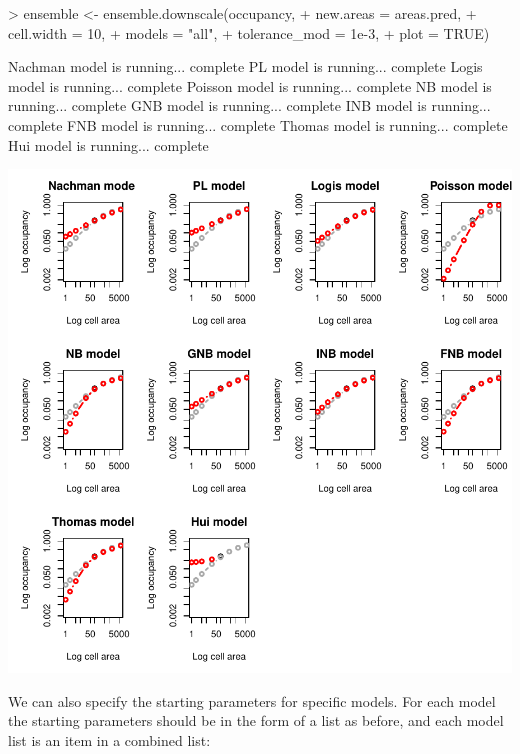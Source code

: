 \documentclass{article}[12pt, a4paper]
\begin{document}
\begin{Schunk}
\begin{Sinput}
> ensemble <- ensemble.downscale(occupancy,
+                                new.areas = areas.pred,
+                                cell.width = 10,
+                                models = "all",
+                                tolerance_mod = 1e-3,
+                                plot = TRUE)
\end{Sinput}
\begin{Soutput}
Nachman model is running...  complete 
PL model is running...  complete 
Logis model is running...  complete 
Poisson model is running...  complete 
NB model is running...  complete 
GNB model is running...  complete 
INB model is running...  complete 
FNB model is running...  complete 
Thomas model is running...  complete 
Hui model is running...  complete 

\end{Soutput}
\end{Schunk}
\includegraphics{Downscaling-downscale24}

We can also specify the starting parameters for specific models. For each model the starting parameters should be in the form of a list as before, and each model list is an item in a combined list:
\end{document}
